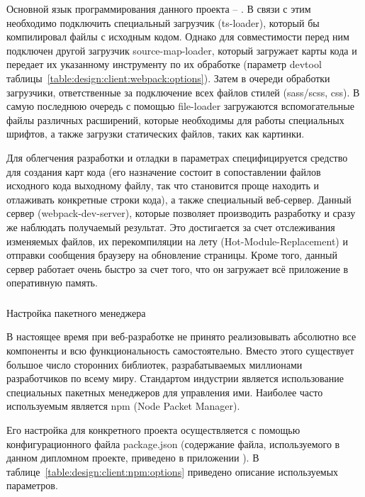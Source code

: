 Основной язык программирования данного проекта -- \typescript. В связи с этим необходимо подключить специальный загрузчик (ts-loader), который бы компилировал файлы с исходным кодом. Однако для совместимости перед ним подключен другой загрузчик source-map-loader, который загружает карты кода и передает их указанному инструменту по их обработке (параметр devtool таблицы~\ref{table:design:client:webpack:options}). Затем в очереди обработки загрузчики, ответственные за подключение всех файлов стилей (sass/scss, css). В самую последнюю очередь с помощью file-loader загружаются вспомогательные файлы различных расширений, которые необходимы для работы специальных шрифтов, а также загрузки статических файлов, таких как картинки.

Для облегчения разработки и отладки в параметрах специфицируется средство для создания карт кода (его назначение состоит в сопоставлении файлов исходного кода выходному файлу, так что становится проще находить и отлаживать конкретные строки кода), а также специальный веб-сервер. Данный сервер (webpack-dev-server), которые позволяет производить разработку и сразу же наблюдать получаемый результат. Это достигается за счет отслеживания изменяемых файлов, их перекомпиляции на лету (Hot-Module-Replacement) и отправки сообщения браузеру на обновление страницы. Кроме того, данный сервер работает очень быстро за счет того, что он загружает всё приложение в оперативную память.

\subsubsection{} Настройка пакетного менеджера
\label{sec:design:client:npm}

В настоящее время при веб-разработке не принято реализовывать абсолютно все компоненты и всю функциональность самостоятельно. Вместо этого существует большое число сторонних библиотек, разрабатываемых миллионами разработчиков по всему миру. Стандартом индустрии является использование специальных пакетных менеджеров для управления ими. Наиболее часто используемым является npm (Node Packet Manager). 

Его настройка для конкретного проекта осуществляется с помощью конфигурационного файла package.json (содержание файла, используемого в данном дипломном проекте, приведено в приложении \configfilesappendix). В таблице~\ref{table:design:client:npm:options} приведено описание используемых параметров.

